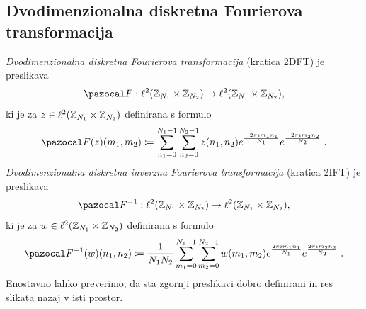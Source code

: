 \subsection{Dvodimenzionalna diskretna Fourierova transformacija}
\emph{Dvodimenzionalna diskretna Fourierova transformacija} (kratica 2DFT) je preslikava
$$\fun{\F}{\l^2(\Z_{N_1} \times \Z_{N_2})}{\l^2(\Z_{N_1} \times \Z_{N_2})},$$
ki je za $z \in \ell^2(\mathbb Z_{N_1} \times \mathbb Z_{N_2})$ definirana s formulo
$$\F(z)(m_1, m_2) \coloneqq \sum_{n_1 = 0}^{N_1 - 1} \sum_{n_2 = 0}^{N_2 - 1} z(n_1, n_2) e^{\frac{-2\pi \imath m_1n_1}{N_1}} e^{\frac{-2\pi \imath m_2n_2}{N_2}} \;.$$
\emph{Dvodimenzionalna diskretna inverzna Fourierova transformacija} (kratica 2IFT) je preslikava
$$\fun{\F^{-1}}{\l^2(\Z_{N_1} \times \Z_{N_2})}{\l^2(\Z_{N_1} \times \Z_{N_2})},$$
ki je za $w \in \ell^2(\mathbb Z_{N_1} \times \mathbb Z_{N_2})$ definirana s formulo
$$\F^{-1}(w)(n_1, n_2) \coloneqq \frac{1}{N_1 N_2} \sum_{m_1 = 0}^{N_1 - 1} \sum_{m_2 = 0}^{N_2 - 1} w(m_1, m_2) e^{\frac{2\pi \imath m_1n_1}{N_1}} e^{\frac{2\pi \imath m_2n_2}{N_2}} \;.$$
%
Enostavno lahko preverimo, da sta zgornji preslikavi dobro definirani in res slikata nazaj v isti prostor.

